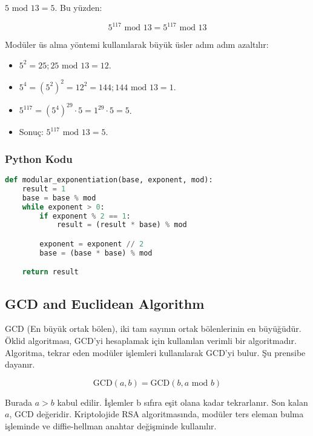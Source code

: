 $ 5 \text{ mod } 13 = 5$. Bu yüzden:

\[ 5^{117} \text{ mod } 13 = 5^{117} \text{ mod } 13 \]

Modüler üs alma yöntemi kullanılarak büyük üsler adım adım azaltılır:

\begin{itemize}
    \item $5^2 = 25; 25 \text{ mod } 13 = 12$.
    \item $5^4 = (5^{2})^2 = 12^2 = 144; 144 \text{ mod } 13 = 1$.
    \item $5^{117} = (5^4)^29 \cdot 5 = 1^{29} \cdot 5 = 5$.
    \item Sonuç: $5^{117} \text{ mod } 13 = 5$.
\end{itemize}

\subsubsection{Python Kodu}

\begin{lstlisting}[language=Python]
def modular_exponentiation(base, exponent, mod):
    result = 1
    base = base % mod
    while exponent > 0:
        if exponent % 2 == 1:
            result = (result * base) % mod

        exponent = exponent // 2
        base = (base * base) % mod

    return result
\end{lstlisting}

\newpage

\subsection{GCD and Euclidean Algorithm}

GCD (En büyük ortak bölen), iki tam sayının ortak bölenlerinin en büyüğüdür. Öklid algoritması, GCD'yi hesaplamak için kullanılan verimli bir algoritmadır. Algoritma, tekrar eden modüler işlemleri kullanılarak GCD'yi bulur. Şu prensibe dayanır.

\[ \text{GCD}(a, b) = \text{GCD}(b, a \text{ mod } b) \]

Burada $a > b$ kabul edilir. İşlemler b sıfıra eşit olana kadar tekrarlanır. Son kalan $a$, GCD değeridir. Kriptolojide RSA algoritmasında, modüler ters eleman bulma işleminde ve diffie-hellman anahtar değişminde kullanılır.

